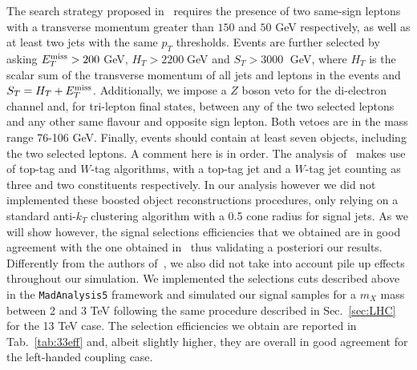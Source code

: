 \documentclass[a4paper]{article}
\begin{document}
The search strategy proposed in~\cite{Avetisyan:2013rca} requires the presence of two same-sign leptons with a transverse momentum greater than $150$ and $50$ GeV respectively, as well as at least two jets with the same $p_T$ thresholds. Events are further selected by asking $E_T^{\rm miss}>200\;$GeV, $H_T>2200\;$GeV and $S_T>3000\;$ GeV, where $H_T$ is the scalar sum of the transverse momentum of all jets and leptons in the events and $S_T=H_T+E_T^{\rm miss}$. Additionally, we impose a $Z$ boson veto for the di-electron channel and, for tri-lepton final states, between any of the two selected leptons and any other same flavour and opposite sign lepton. Both vetoes are in the mass range 76-106 GeV. Finally, events should contain at least seven objects, including the two selected leptons. A comment here is in order. The analysis of~\cite{Avetisyan:2013rca} makes use of top-tag and $W$-tag algorithms, with a top-tag jet and a $W$-tag jet counting as three and two constituents respectively. In our analysis however we did not implemented these  boosted object reconstructions procedures, only relying on a standard anti-$k_T$ clustering algorithm with a 0.5 cone radius for signal jets. As we will show however, the signal selections efficiencies that we obtained are in good agreement with the one obtained in~\cite{Avetisyan:2013rca} thus validating a posteriori our results. Differently from the authors of~\cite{Avetisyan:2013rca}, we also did not take into account pile up effects throughout our simulation. We implemented the selections cuts described above in the {\tt MadAnalysis5} framework and simulated our signal samples for a $m_X$ mass between 2 and 3 TeV following the same procedure described in Sec.~\ref{sec:LHC} for the 13 TeV case. The selection efficiencies we obtain are reported in Tab.~\ref{tab:33eff} and, albeit slightly higher, they are overall in good agreement for the left-handed coupling case.
\end{document}
